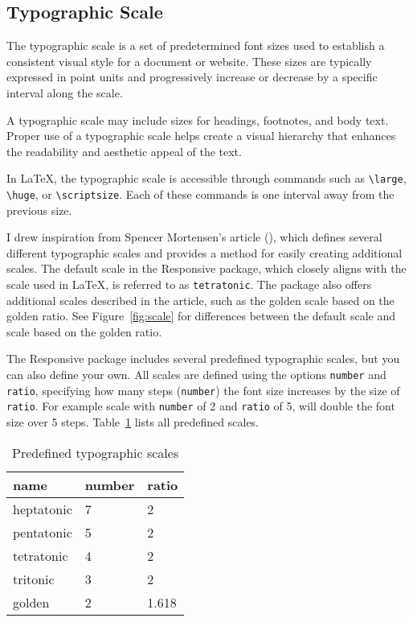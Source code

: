 \documentclass{ltxdoc}
\begin{document}
\subsection{Typographic Scale}

The typographic scale is a set of predetermined font sizes used to establish a
consistent visual style for a document or website. These sizes are typically
expressed in point units and progressively increase or decrease by a specific
interval along the scale.

A typographic scale may include sizes for headings, footnotes, and body text.
Proper use of a typographic scale helps create a visual hierarchy that enhances
the readability and aesthetic appeal of the text. 

In \LaTeX, the typographic scale is accessible through commands such as \verb|\large|,
\verb|\huge|, or \verb|\scriptsize|. Each of these commands is one interval
away from the previous size. 

I drew inspiration from Spencer Mortensen's article (\citeyear{mortensen}), which defines several
different typographic scales and provides a method for easily creating
additional scales.
The default scale in the Responsive package,
which closely aligns with the scale used in \LaTeX, is referred to as \verb|tetratonic|.
The package also offers additional scales described in the
article, such as the golden scale based on the golden ratio. 
See Figure~\ref{fig:scale} for differences between the default scale and scale based on the 
golden ratio.

The Responsive package includes several predefined typographic scales, but you
can also define your own. All scales are defined using the options
\verb|number| and \verb|ratio|, specifying how many steps (\verb|number|) the
font size increases by the size of \verb|ratio|. For example scale with \verb|number| of 2
and \verb|ratio| of 5, will double the font size over 5 steps.
Table~\ref{tbl:scales} lists all predefined scales.

\begin{table}[htbp]
  \centering
  \begin{tabular}{l l l}
    \toprule
    name & number & ratio\\
    \midrule
    heptatonic & 7 & 2\\
    pentatonic & 5 & 2\\
    tetratonic & 4 & 2\\
    tritonic & 3 & 2\\
    golden & 2 & 1.618\\\bottomrule
  \end{tabular}
  \caption{Predefined typographic scales}\label{tbl:scales}
\end{table}
\end{document}
